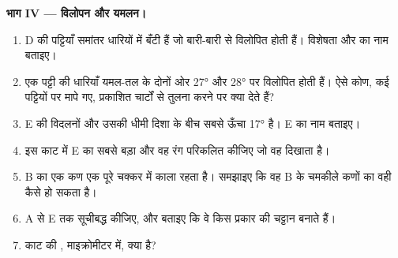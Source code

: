 \begin{problem}
\medskip
\medskip
\noindent\textbf{भाग IV --- विलोपन और यमलन।}
\begin{enumerate}[resume]
  \item D की पट्टियाँ समांतर धारियों में बँटी हैं जो बारी-बारी से विलोपित होती हैं। विशेषता और  का नाम बताइए।
  \item एक पट्टी की धारियाँ यमल-तल के दोनों ओर \ang{27} और \ang{28} पर विलोपित होती हैं। ऐसे कोण, कई पट्टियों पर मापे गए,
        प्रकाशित चार्टों से तुलना करने पर क्या देते हैं?
  \item E की विदलनों और उसकी धीमी दिशा के बीच सबसे ऊँचा  \ang{17} है। E का नाम बताइए।
  \item इस काट में E का सबसे बड़ा  और वह रंग परिकलित कीजिए जो वह दिखाता है।
  \item B का एक कण एक पूरे चक्कर में काला रहता है। समझाइए कि वह B के चमकीले कणों का वही  कैसे हो सकता है।
  \item {} A से E तक सूचीबद्ध कीजिए, और बताइए कि वे किस प्रकार की चट्टान बनाते हैं।
  \item काट की , माइक्रोमीटर में, क्या है?
\end{enumerate}
\end{problem}
